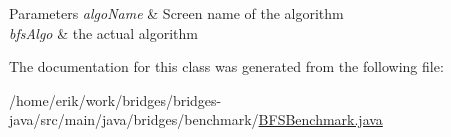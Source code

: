 \begin{DoxyParams}{Parameters}
{\em algo\+Name} & Screen name of the algorithm \\
\hline
{\em bfs\+Algo} & the actual algorithm \\
\hline
\end{DoxyParams}


The documentation for this class was generated from the following file\+:\begin{DoxyCompactItemize}
\item 
/home/erik/work/bridges/bridges-\/java/src/main/java/bridges/benchmark/\hyperlink{_b_f_s_benchmark_8java}{B\+F\+S\+Benchmark.\+java}\end{DoxyCompactItemize}
